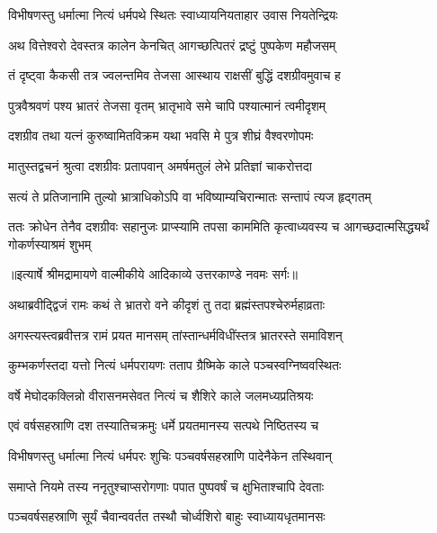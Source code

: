 \twolineshloka
{विभीषणस्तु धर्मात्मा नित्यं धर्मपथे स्थितः}
{स्वाध्यायनियताहार उवास नियतेन्द्रियः} %

\twolineshloka
{अथ वित्तेश्वरो देवस्तत्र कालेन केनचित्}
{आगच्छत्पितरं द्रष्टुं पुष्पकेण महौजसम्} %

\twolineshloka
{तं दृष्ट्वा कैकसी तत्र ज्वलन्तमिव तेजसा}
{आस्थाय राक्षसीं बुद्धिं दशग्रीवमुवाच ह} %

\twolineshloka
{पुत्रवैश्रवणं पश्य भ्रातरं तेजसा वृतम्}
{भ्रातृभावे समे चापि पश्यात्मानं त्वमीदृशम्} %

\twolineshloka
{दशग्रीव तथा यत्नं कुरुष्वामितविक्रम}
{यथा भवसि मे पुत्र शीघ्रं वैश्वरणोपमः} %

\twolineshloka
{मातुस्तद्वचनं श्रुत्वा दशग्रीवः प्रतापवान्}
{अमर्षमतुलं लेभे प्रतिज्ञां चाकरोत्तदा} %

\twolineshloka
{सत्यं ते प्रतिजानामि तुल्यो भ्रात्राधिकोऽपि वा}
{भविष्याम्यचिरान्मातः सन्तापं त्यज हृद्गतम्} %

\threelineshloka
{ततः क्रोधेन तेनैव दशग्रीवः सहानुजः}
{प्राप्स्यामि तपसा काममिति कृत्वाध्यवस्य च}
{आगच्छदात्मसिद्ध्यर्थं गोकर्णस्याश्रमं शुभम्} %


{॥इत्यार्षे श्रीमद्रामायणे वाल्मीकीये आदिकाव्ये उत्तरकाण्डे नवमः सर्गः॥}


\twolineshloka
{अथाब्रवीद्द्विजं रामः कथं ते भ्रातरो वने}
{कीदृशं तु तदा ब्रह्मंस्तपश्चेरुर्महाव्रताः} %

\twolineshloka
{अगस्त्यस्त्वब्रवीत्तत्र रामं प्रयत मानसम्}
{तांस्तान्धर्मविधींस्तत्र भ्रातरस्ते समाविशन्} %

\twolineshloka
{कुम्भकर्णस्तदा यत्तो नित्यं धर्मपरायणः}
{तताप ग्रैष्मिके काले पञ्चस्वग्निष्ववस्थितः} %

\twolineshloka
{वर्षे मेघोदकक्लिन्नो वीरासनमसेवत}
{नित्यं च शैशिरे काले जलमध्यप्रतिश्रयः} %

\twolineshloka
{एवं वर्षसहस्राणि दश तस्यातिचक्रमुः}
{धर्मे प्रयतमानस्य सत्पथे निष्ठितस्य च} %

\twolineshloka
{विभीषणस्तु धर्मात्मा नित्यं धर्मपरः शुचिः}
{पञ्चवर्षसहस्राणि पादेनैकेन तस्थिवान्} %

\twolineshloka
{समाप्ते नियमे तस्य ननृतुश्चाप्सरोगणाः}
{पपात पुष्पवर्षं च क्षुभिताश्चापि देवताः} %

\twolineshloka
{पञ्चवर्षसहस्राणि सूर्यं चैवान्ववर्तत}
{तस्थौ चोर्ध्वशिरो बाहुः स्वाध्यायधृतमानसः} %

